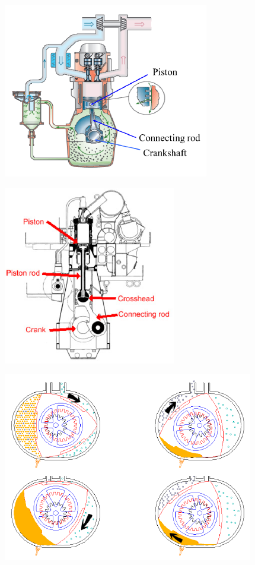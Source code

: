 		\begin{center}
		\begin{minipage}{0.34\textwidth}
		\includegraphics[scale=0.55]{ch1/2}
		\label{fig:1.2}
		\end{minipage}
		\begin{minipage}{0.28\textwidth}
		\includegraphics[scale=0.53]{ch1/3}
		\label{fig:1.3}
		\end{minipage}
		\begin{minipage}{0.35\textwidth}
		\includegraphics[scale=0.5]{ch1/4}
		\label{fig:1.4}
		\end{minipage}
		\end{center}
		
